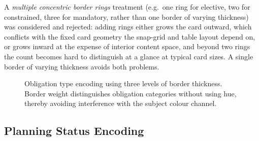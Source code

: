 A \emph{multiple concentric border rings} treatment (e.g.\ one ring for elective, two for constrained, three for mandatory, rather than one border of varying thickness) was considered and rejected: adding rings either grows the card outward, which conflicts with the fixed card geometry the snap-grid and table layout depend on, or grows inward at the expense of interior content space, and beyond two rings the count becomes hard to distinguish at a glance at typical card sizes. A single border of varying thickness avoids both problems.
\begin{figure}[htbp]
\centering
{}
\caption{Obligation type encoding using three levels of border thickness. Border weight distinguishes obligation categories without using hue, thereby avoiding interference with the subject colour channel.}
\label{fig:obligation-rings}
\end{figure}


\subsection{Planning Status Encoding}
\label{sec:status}

